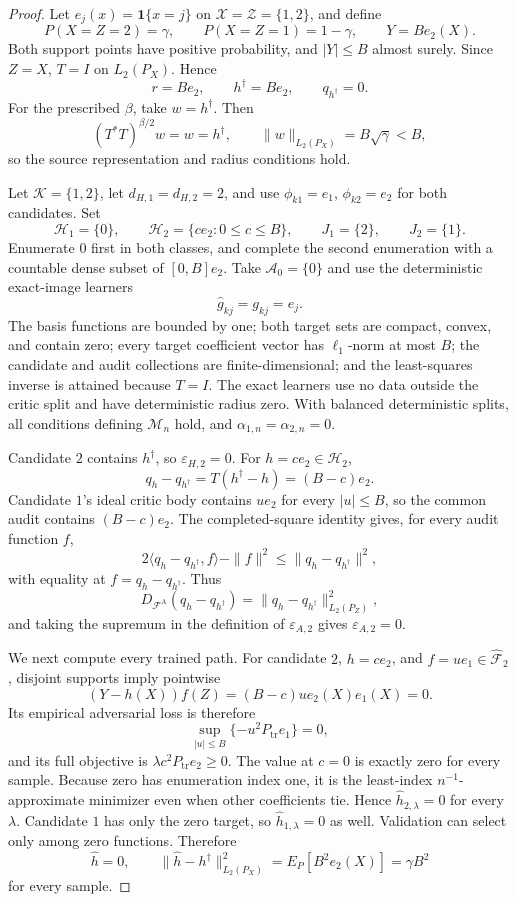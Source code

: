 \begin{proof}
Let \(e_j(x)=\mathbf 1\{x=j\}\) on \(\mathcal X=\mathcal Z=\{1,2\}\), and define
\[
 P(X=Z=2)=\gamma,
 \qquad
 P(X=Z=1)=1-\gamma,
 \qquad
 Y=B e_2(X).
\]
Both support points have positive probability, and \(|Y|\le B\) almost surely. Since \(Z=X\), \(T=I\) on \(L_2(P_X)\). Hence
\[
 r=B e_2,
 \qquad
 h^\dagger=B e_2,
 \qquad
 q_{h^\dagger}=0.
\]
For the prescribed \(\beta\), take \(w=h^\dagger\). Then
\[
 (T^*T)^{\beta/2}w=w=h^\dagger,
 \qquad
 \|w\|_{L_2(P_X)}=B\sqrt\gamma<B,
\]
so the source representation and radius conditions hold.

Let \(\mathcal K=\{1,2\}\), let \(d_{H,1}=d_{H,2}=2\), and use \(\phi_{k1}=e_1\), \(\phi_{k2}=e_2\) for both candidates. Set
\[
 \mathcal H_1=\{0\},
 \qquad
 \mathcal H_2=\{c e_2:0\le c\le B\},
 \qquad
 J_1=\{2\},
 \qquad
 J_2=\{1\}.
\]
Enumerate \(0\) first in both classes, and complete the second enumeration with a countable dense subset of \([0,B]e_2\). Take \(\mathcal A_0=\{0\}\) and use the deterministic exact-image learners
\[
 \widehat g_{kj}=g_{kj}=e_j.
\]
The basis functions are bounded by one; both target sets are compact, convex, and contain zero; every target coefficient vector has \(\ell_1\)-norm at most \(B\); the candidate and audit collections are finite-dimensional; and the least-squares inverse is attained because \(T=I\). The exact learners use no data outside the critic split and have deterministic radius zero. With balanced deterministic splits, all conditions defining \(\mathcal M_n\) hold, and \(\alpha_{1,n}=\alpha_{2,n}=0\).

Candidate \(2\) contains \(h^\dagger\), so \(\varepsilon_{H,2}=0\). For \(h=c e_2\in\mathcal H_2\),
\[
 q_h-q_{h^\dagger}=T(h^\dagger-h)=(B-c)e_2.
\]
Candidate \(1\)'s ideal critic body contains \(u e_2\) for every \(|u|\le B\), so the common audit contains \((B-c)e_2\). The completed-square identity gives, for every audit function \(f\),
\[
 2\langle q_h-q_{h^\dagger},f\rangle-\|f\|^2
 \le\|q_h-q_{h^\dagger}\|^2,
\]
with equality at \(f=q_h-q_{h^\dagger}\). Thus
\[
 D_{\mathcal F^{\mathrm A}}(q_h-q_{h^\dagger})
 =\|q_h-q_{h^\dagger}\|_{L_2(P_Z)}^2,
\]
and taking the supremum in the definition of \(\varepsilon_{A,2}\) gives \(\varepsilon_{A,2}=0\).

We next compute every trained path. For candidate \(2\), \(h=c e_2\), and \(f=u e_1\in\widehat{\mathcal F}_2\), disjoint supports imply pointwise
\[
 (Y-h(X))f(Z)=(B-c)u e_2(X)e_1(X)=0.
\]
Its empirical adversarial loss is therefore
\[
 \sup_{|u|\le B}\{-u^2P_{\mathrm{tr}}e_1\}=0,
\]
and its full objective is \(\lambda c^2P_{\mathrm{tr}}e_2\ge0\). The value at \(c=0\) is exactly zero for every sample. Because zero has enumeration index one, it is the least-index \(n^{-1}\)-approximate minimizer even when other coefficients tie. Hence \(\widehat h_{2,\lambda}=0\) for every \(\lambda\). Candidate \(1\) has only the zero target, so \(\widehat h_{1,\lambda}=0\) as well. Validation can select only among zero functions. Therefore
\[
 \widehat h=0,
 \qquad
 \|\widehat h-h^\dagger\|_{L_2(P_X)}^2
 =E_P[B^2e_2(X)]=\gamma B^2
\]
for every sample.


\end{proof}
